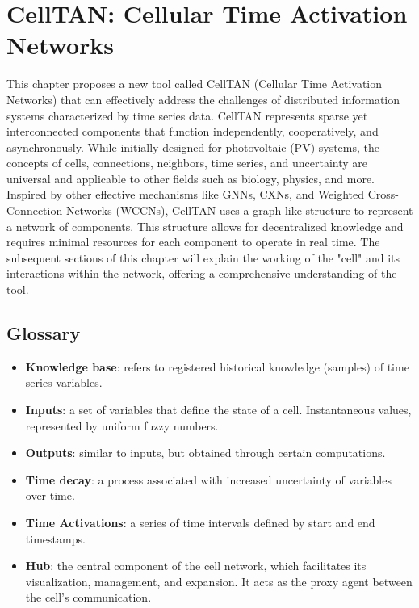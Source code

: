 \chapter{CellTAN: Cellular Time Activation Networks} \label{chap:chap4}

This chapter proposes a new tool called CellTAN (Cellular Time Activation Networks) that can effectively address the challenges of distributed information systems characterized by time series data. CellTAN represents sparse yet interconnected components that function independently, cooperatively, and asynchronously. While initially designed for photovoltaic (PV) systems, the concepts of cells, connections, neighbors, time series, and uncertainty are universal and applicable to other fields such as biology, physics, and more.
Inspired by other effective mechanisms like GNNs, CXNs, and Weighted Cross-Connection Networks (WCCNs), CellTAN uses a graph-like structure to represent a network of components. This structure allows for decentralized knowledge and requires minimal resources for each component to operate in real time.
The subsequent sections of this chapter will explain the working of the "cell" and its interactions within the network, offering a comprehensive understanding of the tool.

\section{Glossary}

\begin{itemize}
    \item \textbf{Knowledge base}: refers to registered historical knowledge (samples) of time series variables.
    
    \item \textbf{Inputs}: a set of variables that define the state of a cell. Instantaneous values, represented by uniform fuzzy numbers.

    \item \textbf{Outputs}: similar to inputs, but obtained through certain computations.

    \item \textbf{Time decay}: a process associated with increased uncertainty of variables over time.
    
    \item \textbf{Time Activations}: a series of time intervals defined by start and end timestamps.

    \item \textbf{Hub}: the central component of the cell network, which facilitates its visualization, management, and expansion. It acts as the proxy agent between the cell's communication.
    
\end{itemize}


